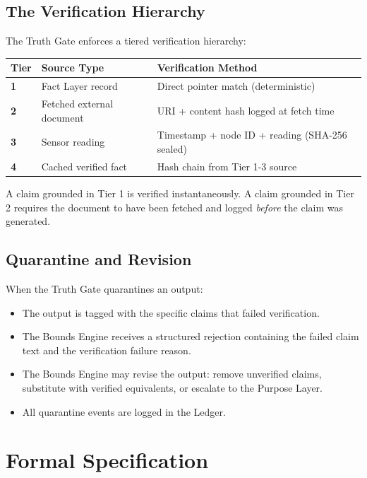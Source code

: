 \documentclass[12pt]{article}
\begin{document}
\subsection{The Verification Hierarchy}

The Truth Gate enforces a tiered verification hierarchy:

\begin{center}
\begin{tabular}{>{\bfseries}p{2cm} p{5cm} p{4cm}}
\toprule
\textbf{Tier} & \textbf{Source Type} & \textbf{Verification Method} \\
\midrule
1 & Fact Layer record & Direct pointer match (deterministic) \\
\midrule
2 & Fetched external document & URI + content hash logged at fetch time \\
\midrule
3 & Sensor reading & Timestamp + node ID + reading (SHA-256 sealed) \\
\midrule
4 & Cached verified fact & Hash chain from Tier 1-3 source \\
\bottomrule
\end{tabular}
\end{center}

A claim grounded in Tier 1 is verified instantaneously. A claim grounded in Tier 2 requires the document to have been fetched and logged \textit{before} the claim was generated.

\subsection{Quarantine and Revision}

When the Truth Gate quarantines an output:

\begin{itemize}[noitemsep]
    \item The output is tagged with the specific claims that failed verification.
    \item The Bounds Engine receives a structured rejection containing the failed claim text and the verification failure reason.
    \item The Bounds Engine may revise the output: remove unverified claims, substitute with verified equivalents, or escalate to the Purpose Layer.
    \item All quarantine events are logged in the Ledger.
\end{itemize}

\section{Formal Specification}
\label{sec:formal}
\end{document}
